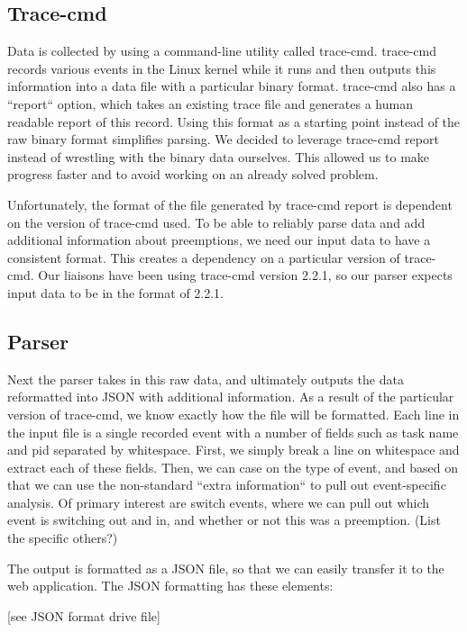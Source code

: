 \documentclass{hmcclinic}
\begin{document}
  \subsection{Trace-cmd}

  Data is collected by using a command-line utility called trace-cmd.
  trace-cmd records various events in the Linux kernel while it runs and then
  outputs this information into a data file with a particular binary format.
  trace-cmd also has a ``report`` option, which takes an existing trace file and
  generates a human readable report of this record. Using this format as a
  starting point instead of the raw binary format simplifies parsing.  We
  decided to leverage trace-cmd report instead of wrestling with the binary data
  ourselves. This allowed us to make progress faster and to avoid working on an
  already solved problem.

   Unfortunately, the format of the file generated by trace-cmd report is
   dependent on the version of trace-cmd used. To be able to reliably parse data
   and add additional information about preemptions, we need our input data to
   have a consistent format. This creates a dependency on a particular version
   of trace-cmd. Our liaisons have been using trace-cmd version 2.2.1, so our
   parser expects input data to be in the format of 2.2.1.


  \subsection{Parser}
  Next the parser takes in this raw data, and ultimately outputs the data
  reformatted into JSON with additional information. As a result of the
  particular version of trace-cmd, we know exactly how the file will be
  formatted. Each line in the input file is a single recorded event with a
  number of fields such as task name and pid separated by whitespace. First, we
  simply break a line on whitespace and extract each of these fields. Then, we
  can case on the type of event, and based on that we can use the non-standard
  ``extra information`` to pull out event-specific analysis. Of primary interest
  are switch events, where we can pull out which event is switching out and in,
  and whether or not this was a preemption. (List the specific others?)

  The output is formatted as a JSON file, so that we can easily transfer it to
  the web application. The JSON formatting has these elements:

  [see JSON format drive file]
\end{document}
